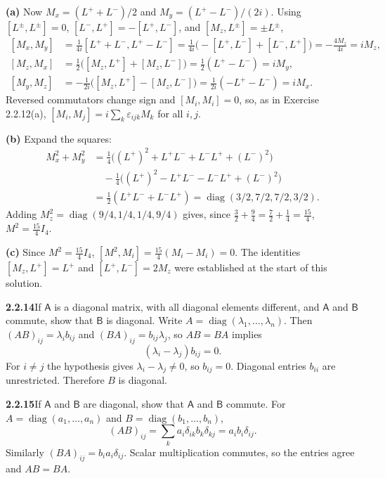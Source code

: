 \textbf{(a)} Now $M_x=(L^++L^-)/2$ and $M_y=(L^+-L^-)/(2i)$. Using
$[L^\pm,L^\pm]=0$, $[L^-,L^+]=-[L^+,L^-]$, and
$[M_z,L^\pm]=\pm L^\pm$,
\[
\begin{aligned}
{}[M_x,M_y]&=\frac1{4i}[L^++L^-,L^+-L^-]
=\frac1{4i}\bigl(-[L^+,L^-]+[L^-,L^+]\bigr)
=-\frac{4M_z}{4i}=iM_z,\\
[M_z,M_x]&=\tfrac12\bigl([M_z,L^+]+[M_z,L^-]\bigr)
=\tfrac12(L^+-L^-)=iM_y,\\
[M_y,M_z]&=-\tfrac1{2i}\bigl([M_z,L^+]-[M_z,L^-]\bigr)
=\tfrac1{2i}(-L^+-L^-)=iM_x.
\end{aligned}
\]
Reversed commutators change sign and $[M_i,M_i]=0$, so, as in
Exercise 2.2.12(a), $[M_i,M_j]=i\sum_k\varepsilon_{ijk}M_k$ for all
$i,j$.

\textbf{(b)} Expand the squares:
\[
\begin{aligned}
M_x^2+M_y^2
&=\tfrac14\bigl((L^+)^2+L^+L^-+L^-L^++(L^-)^2\bigr)\\
&\quad-\tfrac14\bigl((L^+)^2-L^+L^--L^-L^++(L^-)^2\bigr)\\
&=\tfrac12(L^+L^-+L^-L^+)
=\operatorname{diag}(3/2,7/2,7/2,3/2).
\end{aligned}
\]
Adding $M_z^2=\operatorname{diag}(9/4,1/4,1/4,9/4)$ gives, since
$\frac32+\frac94=\frac72+\frac14=\frac{15}4$,
$\boxed{M^2=\tfrac{15}{4}I_4}$.

\textbf{(c)} Since $M^2=\tfrac{15}{4}I_4$,
$[M^2,M_i]=\tfrac{15}{4}(M_i-M_i)=0$. The identities
$[M_z,L^+]=L^+$ and $[L^+,L^-]=2M_z$ were established at the start of
this solution.

\par\bigskip
\noindent\textbf{2.2.14}\quad If $\mathsf{A}$ is a diagonal matrix, with all
diagonal elements different, and $\mathsf{A}$ and $\mathsf{B}$ commute, show
that $\mathsf{B}$ is diagonal.
\solution
Write $A=\operatorname{diag}(\lambda_1,\ldots,\lambda_n)$.
Then $(AB)_{ij}=\lambda_i b_{ij}$ and $(BA)_{ij}=b_{ij}\lambda_j$,
so $AB=BA$ implies
\[
(\lambda_i-\lambda_j)b_{ij}=0.
\]
For $i\ne j$ the hypothesis gives $\lambda_i-\lambda_j\ne0$,
so $b_{ij}=0$. Diagonal entries $b_{ii}$ are unrestricted.
Therefore $B$ is diagonal.

\par\bigskip
\noindent\textbf{2.2.15}\quad If $\mathsf{A}$ and $\mathsf{B}$ are diagonal,
show that $\mathsf{A}$ and $\mathsf{B}$ commute.
\solution
For $A=\operatorname{diag}(a_1,\ldots,a_n)$ and
$B=\operatorname{diag}(b_1,\ldots,b_n)$,
\[
(AB)_{ij}=\sum_k a_i\delta_{ik}b_k\delta_{kj}=a_ib_i\delta_{ij}.
\]
Similarly $(BA)_{ij}=b_ia_i\delta_{ij}$. Scalar multiplication
commutes, so the entries agree and $AB=BA$.

